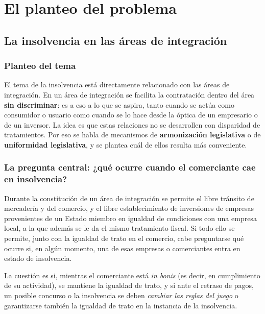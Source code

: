 \documentclass[12pt,oneside]{book}
\begin{document}
\chapter[El planteo del problema]{El planteo del problema}

\section{La insolvencia en las áreas de integración}

\subsection{Planteo del tema}

El tema de la insolvencia está directamente relacionado con las áreas de integración. En un área de integración se facilita la contratación dentro del área \textbf{sin discriminar}: es a eso a lo que se aspira, tanto cuando se actúa como consumidor o usuario como cuando se lo hace desde la óptica de un empresario o de un inversor. La idea es que estas relaciones no se desarrollen con disparidad de tratamientos. Por eso se habla de mecanismos de \textbf{armonización legislativa} o de \textbf{uniformidad legislativa}, y se plantea cuál de ellos resulta más conveniente.

\subsection{La pregunta central: ¿qué ocurre cuando el comerciante cae en insolvencia?}

Durante la constitución de un área de integración se permite el libre tránsito de mercadería y del comercio, y el libre establecimiento de inversiones de empresas provenientes de un Estado miembro en igualdad de condiciones con una empresa local, a la que además se le da el mismo tratamiento fiscal. Si todo ello se permite, junto con la igualdad de trato en el comercio, cabe preguntarse qué ocurre si, en algún momento, una de esas empresas o comerciantes entra en estado de insolvencia.

La cuestión es si, mientras el comerciante está \textit{in bonis} (es decir, en cumplimiento de su actividad), se mantiene la igualdad de trato, y si ante el retraso de pagos, un posible concurso o la insolvencia se deben \emph{cambiar las reglas del juego} o garantizarse también la igualdad de trato en la instancia de la insolvencia.
\end{document}
